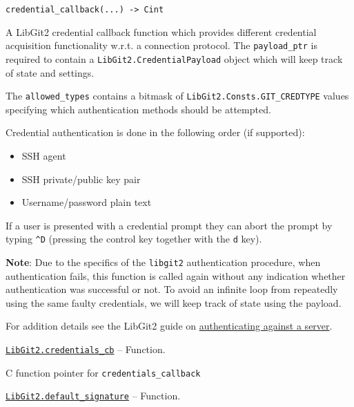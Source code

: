 \begin{adjustwidth}{2em}{0pt}


\begin{verbatim}
credential_callback(...) -> Cint
\end{verbatim}

A LibGit2 credential callback function which provides different credential acquisition functionality w.r.t. a connection protocol. The \texttt{payload\_ptr} is required to contain a \texttt{LibGit2.CredentialPayload} object which will keep track of state and settings.

The \texttt{allowed\_types} contains a bitmask of \texttt{LibGit2.Consts.GIT\_CREDTYPE} values specifying which authentication methods should be attempted.

Credential authentication is done in the following order (if supported):

\begin{itemize}
\item SSH agent


\item SSH private/public key pair


\item Username/password plain text

\end{itemize}
If a user is presented with a credential prompt they can abort the prompt by typing \texttt{{\textasciicircum}D} (pressing the control key together with the \texttt{d} key).

\textbf{Note}: Due to the specifics of the \texttt{libgit2} authentication procedure, when authentication fails, this function is called again without any indication whether authentication was successful or not. To avoid an infinite loop from repeatedly using the same faulty credentials, we will keep track of state using the payload.

For addition details see the LibGit2 guide on \href{https://libgit2.org/docs/guides/authentication/}{authenticating against a server}.



\end{adjustwidth}
\hypertarget{9226239310211022593}{} 
\hyperlink{9226239310211022593}{\texttt{LibGit2.credentials\_cb}}  -- {Function.}

\begin{adjustwidth}{2em}{0pt}

C function pointer for \texttt{credentials\_callback}



\end{adjustwidth}
\hypertarget{4585945206005903475}{} 
\hyperlink{4585945206005903475}{\texttt{LibGit2.default\_signature}}  -- {Function.}

